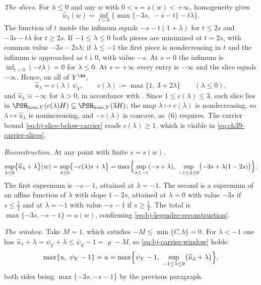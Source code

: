 \begin{example}
\emph{The slices.}  For $\lambda\le0$ and any $w$ with
$0<s=s(w)<+\infty$, homogeneity gives
\[
 \widehat u_\lambda(w)
 =\inf_{t>0}\bigl\{\max\{-3s,\,-s-t\}-t\lambda\bigr\}.
\]
The function of $t$ inside the infimum equals $-s-t(1+\lambda)$ for
$t\le2s$ and $-3s-t\lambda$ for $t\ge2s$.  If $-1\le\lambda\le0$
both pieces are minimized at $t=2s$, with common value
$-3s-2s\lambda$; if $\lambda\le-1$ the first piece is nondecreasing in $t$
and the infimum is approached as $t\downarrow0$, with value $-s$.
At $s=0$ the infimum is $\inf_{t>0}(-t\lambda)=0$ for
$\lambda\le0$.  At $s=+\infty$ every entry is $-\infty$ and the
slice equals $-\infty$.  Hence, on all of $Y^{\An}$,
\[
 \widehat u_\lambda=c(\lambda)\,\psi_Y,
 \qquad
 c(\lambda):=\max\{1,\ 3+2\lambda\}
 \qquad(\lambda\le0),
\tag{39.46}\label{eq:ch39-carrier-slices}
\]
and $\widehat u_\lambda\equiv-\infty$ for $\lambda>0$, in accordance
with .  Since $1\le c(\lambda)\le3$, each
slice lies in $\PSH_{\mathrm{hom},Y}(c(\lambda)H)\subseteq
\PSH_{\mathrm{hom},Y}(3H)$; the map $\lambda\mapsto c(\lambda)$ is
nondecreasing, so $\lambda\mapsto\widehat u_\lambda$ is nonincreasing, and
$-c(\lambda)$ is concave, as
\,(6) requires.  The carrier bound
\eqref{eq:bj-slice-below-carrier} reads $c(\lambda)\ge1$, which is visible
in \eqref{eq:ch39-carrier-slices}.

\emph{Reconstruction.}  At any point with finite $s=s(w)$,
\[
 \sup_{\lambda\le0}\bigl\{\widehat u_\lambda+\lambda\bigr\}(w)
 =\sup_{\lambda\le0}\bigl\{-c(\lambda)s+\lambda\bigr\}
 =\max\Bigl\{\sup_{\lambda\le-1}(-s+\lambda),\
 \sup_{-1\le\lambda\le0}\bigl(-3s+\lambda(1-2s)\bigr)\Bigr\}.
\]
The first supremum is $-s-1$, attained at $\lambda=-1$.  The second is a
supremum of an affine function of $\lambda$ with slope $1-2s$, attained
at $\lambda=0$ with value $-3s$ if $s\le\frac12$ and at
$\lambda=-1$ with value $-s-1$ if $s\ge\frac12$.  The total is
$\max\{-3s,-s-1\}=u(w)$, confirming
\eqref{eq:bj-legendre-reconstruction}.

\emph{The window.}  Take $M=1$, which satisfies
$-M\le\min\{C,b\}=0$.  For $\lambda<-1$ one has
$\widehat u_\lambda+\lambda=\psi_Y+\lambda\le\psi_Y-1=\varrho-M$, so
\eqref{eq:bj-carrier-window} holds:
\[
 \max\{u,\ \psi_Y-1\}=u
 =\max\Bigl\{\psi_Y-1,\ \sup_{-1\le\lambda\le0}
 \bigl(\widehat u_\lambda+\lambda\bigr)\Bigr\},
\]
both sides being $\max\{-3s,-s-1\}$ by the previous paragraph.


\end{example}
